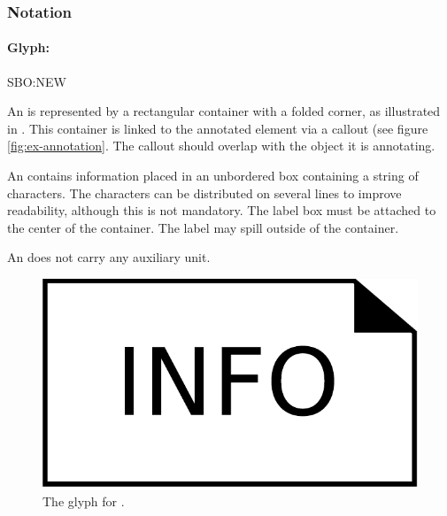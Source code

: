 \subsubsection{Notation}

\paragraph{Glyph: }

\begin{glyphDescription}

\glyphSboTerm SBO:NEW

\glyphContainer An  is represented by a rectangular
container with a folded corner, as illustrated in
. This container is linked to the annotated element
via a callout (see figure \ref{fig:ex-annotation}. The callout should
overlap with the object it is annotating.

\glyphLabel An  contains information placed in an unbordered box containing a string of characters.  The characters can be distributed on several lines to improve readability, although this is not mandatory.  The label box must be attached to the center of the container. The label may spill outside of the container. 

\glyphAux An  does not carry any auxiliary unit.
\end{glyphDescription}

\begin{figure}[H]
  \centering
  \includegraphics[scale = 0.3]{images/annotation}
  \caption{The \PD glyph for .}
  \label{fig:annotation}
\end{figure}

